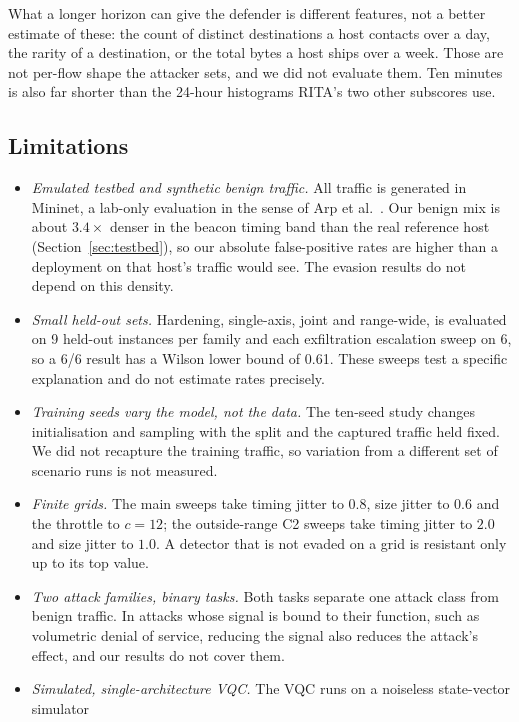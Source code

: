 \documentclass[preprint,12pt]{elsarticle}
\begin{document}
What a longer horizon can give the defender is different features, not a better estimate of these: the
count of distinct destinations a host contacts over a day, the rarity of a destination, or the total
bytes a host ships over a week. Those are not per-flow shape the attacker sets, and we did not evaluate
them. Ten minutes is also far shorter than the 24-hour histograms RITA's two other subscores use.

\subsection{Limitations}
\begin{itemize}
  \item \emph{Emulated testbed and synthetic benign traffic.} All traffic is generated in Mininet, a
        lab-only evaluation in the sense of Arp et al.~\cite{arp2022}. Our
        benign mix is about $3.4\times$ denser in the beacon timing band than the real reference host
        (Section~\ref{sec:testbed}), so our absolute false-positive rates are higher than a deployment
        on that host's traffic would see. The evasion results do not depend on this density.
  \item \emph{Small held-out sets.} Hardening, single-axis, joint and range-wide, is evaluated on 9 held-out
        instances per family and each exfiltration escalation sweep on 6, so a 6/6 result has a Wilson
        lower bound of 0.61. These sweeps test a specific explanation and do not estimate rates
        precisely.
  \item \emph{Training seeds vary the model, not the data.} The ten-seed study changes initialisation
        and sampling with the split and the captured traffic held fixed. We did not recapture the training
        traffic, so variation from a different set of scenario runs is not measured.
  \item \emph{Finite grids.} The main sweeps take timing jitter to $0.8$, size jitter to $0.6$ and the
        throttle to $c=12$; the outside-range C2 sweeps take timing jitter to $2.0$ and size jitter to
        $1.0$. A detector that is not evaded on a grid is resistant only up to its top value.
  \item \emph{Two attack families, binary tasks.} Both tasks separate one attack class from benign
        traffic. In attacks whose signal is bound to their function, such as volumetric denial of
        service, reducing the signal also reduces the attack's effect, and our results do not cover
        them.
  \item \emph{Simulated, single-architecture VQC.} The VQC runs on a noiseless state-vector simulator

\end{itemize}
\end{document}
